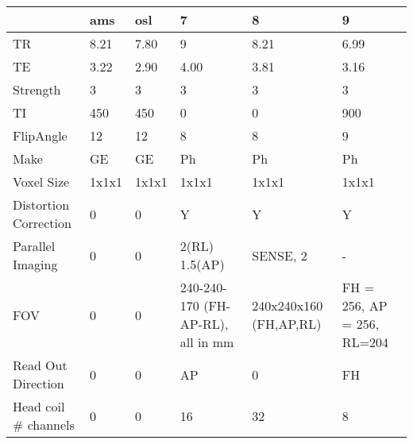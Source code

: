 \begin{table}
[]
\centering
\begin{tabular}{llllll}
\toprule
{} & ams & osl &              7 &      8 &        9 \\
\midrule
TR                    &                   8.21 &               7.80 &                                  9 &                    8.21 &                        6.99 \\
TE                    &                   3.22 &               2.90 &                               4.00 &                    3.81 &                        3.16 \\
Strength              &                      3 &                  3 &                                  3 &                       3 &                           3 \\
TI                    &                    450 &                450 &                                  0 &                       0 &                         900 \\
FlipAngle             &                     12 &                 12 &                                  8 &                       8 &                           9 \\
Make                  &                     GE &                 GE &                                 Ph &                      Ph &                          Ph \\
Voxel Size            &                  1x1x1 &              1x1x1 &                              1x1x1 &                   1x1x1 &                       1x1x1 \\
Distortion Correction &                      0 &                  0 &                                  Y &                       Y &                           Y \\
Parallel Imaging      &                      0 &                  0 &                      2(RL) 1.5(AP) &                SENSE, 2 &                           - \\
FOV                   &                      0 &                  0 &  240-240-170 (FH-AP-RL), all in mm &  240x240x160 (FH,AP,RL) &  FH = 256, AP = 256, RL=204 \\
Read Out Direction    &                      0 &                  0 &                                 AP &                       0 &                          FH \\
Head coil \# channels  &                      0 &                  0 &                                 16 &                      32 &                           8 \\

\end{tabular}
\end{table}
